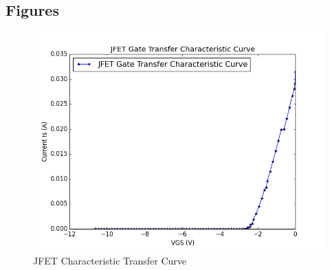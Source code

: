 \documentclass{article}
\begin{document}
\subsection{Figures}
    \begin{figure}[H]
        \centering
        \includegraphics[scale = 0.5]{4_5.png}
        \caption{JFET Characteristic Transfer Curve}
        \label{fig:my_label}
    \end{figure}
\end{document}
